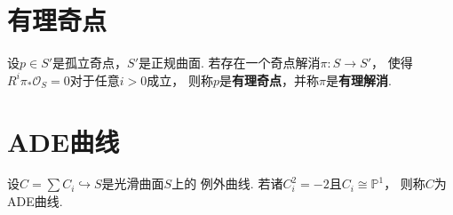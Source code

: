\section{有理奇点}
\begin{definition}
    设$p \in S'$是孤立奇点，$S'$是正规曲面. 
    若存在一个奇点解消$\pi \colon S \to S'$，
    使得$R^{i}\pi_{*}\mathscr{O}_{S} = 0$对于任意$i > 0$成立，
    则称$p$是\textbf{有理奇点}，并称$\pi$是\textbf{有理解消}.
\end{definition}

\section{ADE曲线}
\begin{definition}
    设$C = \sum C_{i} \hookrightarrow S$是光滑曲面$S$上的
    例外曲线. 
    若诸$C_{i}^{2} = -2$且$C_{i} \cong \mathbb{P}^{1}$，
    则称$C$为ADE曲线.
\end{definition}